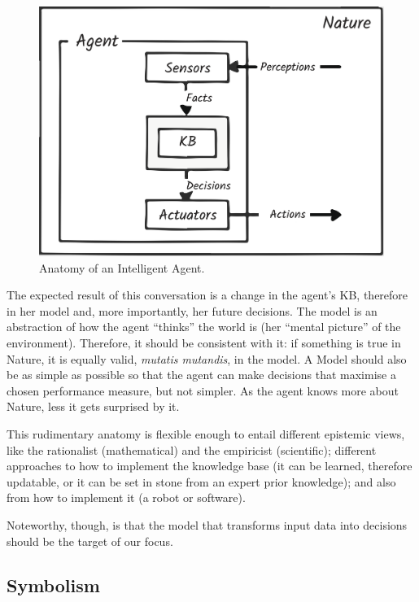\documentclass[
  letterpaper,
  12pt,
  british]{tufte-book}
\theoremstyle{plain}
\theoremstyle{plain}
\theoremstyle{definition}
\theoremstyle{remark}
\begin{document}
\begin{figure}

{\centering \includegraphics{Images/anatomy.png}

}

\caption{Anatomy of an Intelligent Agent.}

\end{figure}

The expected result of this conversation is a change in the agent's
{KB}, therefore in her model and, more importantly, her future
decisions. The model is an abstraction of how the agent ``thinks'' the
world is (her ``mental picture'' of the environment). Therefore, it
should be consistent with it: if something is true in Nature, it is
equally valid, \emph{mutatis mutandis}, in the model. A Model should
also be as simple as possible so that the agent can make decisions that
maximise a chosen performance measure, but not simpler. As the agent
knows more about Nature, less it gets surprised by it.

This rudimentary anatomy is flexible enough to entail different
epistemic views, like the rationalist (mathematical) and the empiricist
(scientific); different approaches to how to implement the knowledge
base (it can be learned, therefore updatable, or it can be set in stone
from an expert prior knowledge); and also from how to implement it (a
robot or software).

Noteworthy, though, is that the model that transforms input data into
decisions should be the target of our focus.

\hypertarget{symbolism}{%
\subsection{Symbolism}\label{symbolism}}
\end{document}
